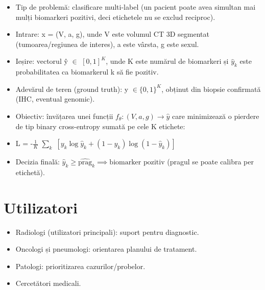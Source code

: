 \documentclass[runningheads,a4paper,11pt]{report}
\begin{document}
\begin{itemize}
    \item Tip de problemă: clasificare multi-label (un pacient poate avea simultan mai mulți biomarkeri pozitivi, deci etichetele nu se exclud reciproc).
    \item Intrare: x = (V, a, g), unde V este volumul CT 3D segmentat (tumoarea/regiunea de interes), a este vârsta, g este sexul.
    \item Ieșire: vectorul ŷ $\in$ $[0,1]^K$, unde K este numărul de biomarkeri și $\hat{y}_k$ este probabilitatea ca biomarkerul k să fie pozitiv.
    \item Adevărul de teren (ground truth): y $\in \{0,1\}^K$, obținut din biopsie confirmată (IHC, eventual genomic).
    \item Obiectiv: învățarea unei funcții $f_\theta: (V, a, g) \to \hat{y}$ care minimizează o pierdere de tip binary cross-entropy sumată pe cele K etichete:
    \item L = -$\frac{1}{K}$ $\sum_{k}$ $\left[ y_k \log \hat{y}_k + (1-y_k) \log(1-\hat{y}_k) \right]$
    \item Decizia finală: $\hat{y}_k \geq \widehat{\text{prag}}_k \implies \text{biomarker pozitiv}$ (pragul se poate calibra per etichetă).
\end{itemize}

\section{Utilizatori}
\begin{itemize}
    \item Radiologi (utilizatori principali): suport pentru diagnostic.
    \item Oncologi și pneumologi: orientarea planului de tratament.
    \item Patologi: prioritizarea cazurilor/probelor.
    \item Cercetători medicali.
\end{itemize}
\end{document}
